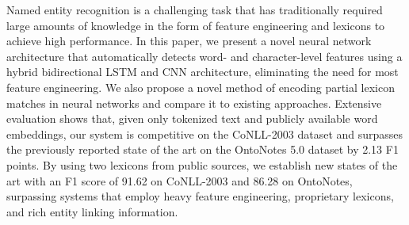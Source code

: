 Named entity recognition is a challenging task that has traditionally required large amounts of knowledge in the form of feature engineering and lexicons to achieve high performance. In this paper, we present a novel neural network architecture that automatically detects word- and character-level features using a hybrid bidirectional LSTM and CNN architecture, eliminating the need for most feature engineering. We also propose a novel method of encoding partial lexicon matches in neural networks and compare it to existing approaches. Extensive evaluation shows that, given only tokenized text and publicly available word embeddings, our system is competitive on the CoNLL-2003 dataset and surpasses the previously reported state of the art on the OntoNotes 5.0 dataset by 2.13 F1 points. By using two lexicons from public sources, we establish new states of the art with an F1 score of 91.62 on CoNLL-2003 and 86.28 on OntoNotes, surpassing systems that employ heavy feature engineering, proprietary lexicons, and rich entity linking information.
